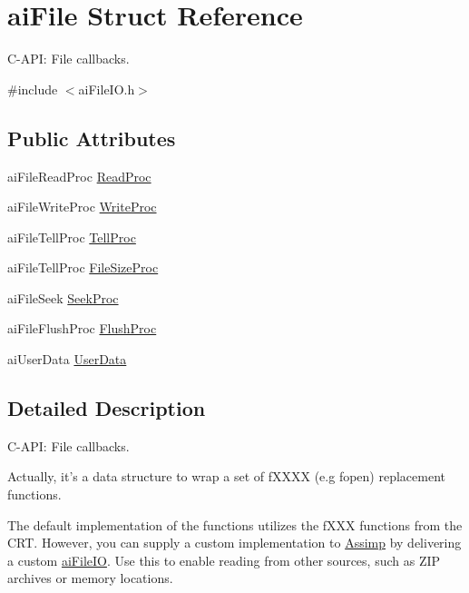 \hypertarget{structai_file}{\section{ai\-File Struct Reference}
\label{structai_file}
}


C-\/\-A\-P\-I\-: File callbacks.  




{\ttfamily \#include $<$ai\-File\-I\-O.\-h$>$}

\subsection*{Public Attributes}
\begin{DoxyCompactItemize}
\item 
ai\-File\-Read\-Proc \hyperlink{structai_file_a52287e81ca67b9d43cc1ce6142f781fa}{Read\-Proc}
\item 
ai\-File\-Write\-Proc \hyperlink{structai_file_ab9fca3a62e34a33592c13a6f31db7d1d}{Write\-Proc}
\item 
ai\-File\-Tell\-Proc \hyperlink{structai_file_aaf2d88a3b2fcbdacf51119658283d27e}{Tell\-Proc}
\item 
ai\-File\-Tell\-Proc \hyperlink{structai_file_aff2fff8c0458e7ec71f7de217c3a3033}{File\-Size\-Proc}
\item 
ai\-File\-Seek \hyperlink{structai_file_a7a07b499be4ad433669246479a4d4ad2}{Seek\-Proc}
\item 
ai\-File\-Flush\-Proc \hyperlink{structai_file_a1102d28d1c0be68ffed20476669bdb0d}{Flush\-Proc}
\item 
ai\-User\-Data \hyperlink{structai_file_aec528fa18f4755fe4f28d604fde28aad}{User\-Data}
\end{DoxyCompactItemize}


\subsection{Detailed Description}
C-\/\-A\-P\-I\-: File callbacks. 

Actually, it's a data structure to wrap a set of f\-X\-X\-X\-X (e.\-g fopen) replacement functions.

The default implementation of the functions utilizes the f\-X\-X\-X functions from the C\-R\-T. However, you can supply a custom implementation to \hyperlink{namespace_assimp}{Assimp} by delivering a custom \hyperlink{structai_file_i_o}{ai\-File\-I\-O}. Use this to enable reading from other sources, such as Z\-I\-P archives or memory locations. 

